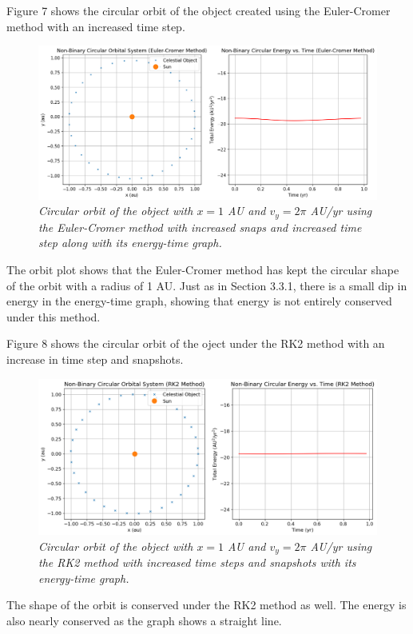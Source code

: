 \documentclass[11 pt, a4paper]{article}
\begin{document}
Figure 7 shows the circular orbit of the object created using the Euler-Cromer method with an increased time step.
\begin{figure}[H]
  \includegraphics[width=1\linewidth]{Euler cromer/eulercromercircularincrease.png}
  \centering
  \caption{\textit{Circular orbit of the object with $x = 1$ AU and $v_y = 2\pi$ AU/yr using the Euler-Cromer method with increased snaps and increased time step along with its energy-time graph.}} 
\end{figure}
The orbit plot shows that the Euler-Cromer method has kept the circular shape of the orbit with a radius of 1 AU. Just as in Section 3.3.1, there is a small dip in energy in the energy-time graph, showing that energy is
not entirely conserved under this method.

Figure 8 shows the circular orbit of the oject under the RK2 method with an increase in time step and snapshots.
\begin{figure}[H]
  \includegraphics[width=1\linewidth]{RK2/rk2circularincrease.png}
  \centering
  \caption{\textit{Circular orbit of the object with $x = 1$ AU and $v_y = 2\pi$ AU/yr using the RK2 method with increased time steps and snapshots with its energy-time graph.}} 
\end{figure}
The shape of the orbit is conserved under the RK2 method as well. The energy is also nearly conserved as the graph shows a straight line.
\end{document}

